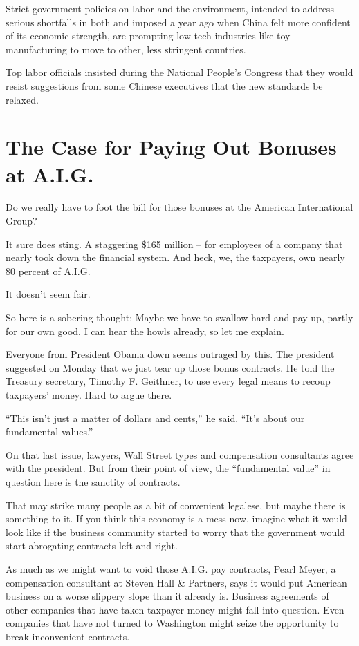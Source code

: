 \documentclass[12pt,a4paper,onecolumn]{article}
\begin{document}
\begin{CJK*}{GBK}{song}
Strict government policies on labor and the environment, intended to address serious shortfalls in
both and imposed a year ago when China felt more confident of its economic strength, are prompting
low-tech industries like toy manufacturing to move to other, less stringent countries.

Top labor officials insisted during the National People's Congress that they would resist suggestions from some Chinese executives that the new standards be relaxed.

\section{The Case for Paying Out Bonuses at A.I.G.}

Do we really have to foot the bill for those bonuses at the American International Group?

It sure does sting. A staggering \$165 million -- for employees of a company that nearly took down
the financial system. And heck, we, the taxpayers, own nearly 80 percent of A.I.G.

It doesn't seem fair.

So here is a sobering thought: Maybe we have to swallow hard and pay up, partly for our own good. I
can hear the howls already, so let me explain.

Everyone from President Obama down seems outraged by this. The president suggested on Monday that we
just tear up those bonus contracts. He told the Treasury secretary, Timothy F. Geithner, to use
every legal means to recoup taxpayers' money. Hard to argue there.

``This isn't just a matter of dollars and cents,'' he said. ``It's about our fundamental values.''

On that last issue, lawyers, Wall Street types and compensation consultants agree with the
president. But from their point of view, the ``fundamental value'' in question here is the sanctity
of contracts.

That may strike many people as a bit of convenient legalese, but maybe there is something to it. If
you think this economy is a mess now, imagine what it would look like if the business community
started to worry that the government would start abrogating contracts left and right.

As much as we might want to void those A.I.G. pay contracts, Pearl Meyer, a compensation consultant
at Steven Hall \& Partners, says it would put American business on a worse slippery slope than it
already is. Business agreements of other companies that have taken taxpayer money might fall into
question. Even companies that have not turned to Washington might seize the opportunity to break
inconvenient contracts.


\end{CJK*}
\end{document}
